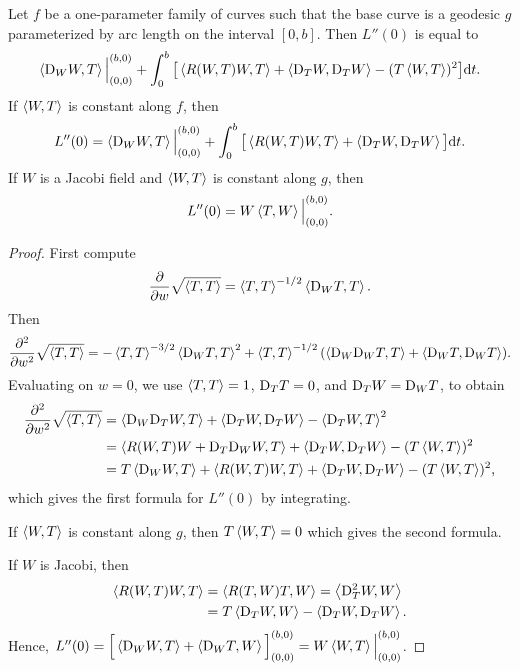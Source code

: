 \documentclass[../main]{subfiles}
\begin{document}
\begin{theorem} \label{thm:ch10.2.6}
    Let $f$ be a one-parameter family of curves such that the base curve is a geodesic $g$ parameterized by arc length on the interval $[0,b]$. Then $L''(0)$ is equal to
    \[ \left\langle\mathrm{D}_W W,T\right\rangle\Big|_{(0,0)}^{(b,0)} + \int_0^b \big[\left\langle R(W, T)W,T\right\rangle + \left\langle\mathrm{D}_T W,\mathrm{D}_T W\right\rangle - (T\left\langle W,T\right\rangle)^2\big] \mathrm{d}t\text{.} \]
    If $\left\langle W,T\right\rangle$ is constant along $f$, then
    \[ L''(0) = \left\langle\mathrm{D}_W W,T\right\rangle\Big|_{(0,0)}^{(b,0)} + \int_0^b \big[\left\langle R(W, T)W,T\right\rangle + \left\langle\mathrm{D}_T W,\mathrm{D}_T W\right\rangle\big] \mathrm{d}t\text{.} \]
    If $W$ is a Jacobi field and $\left\langle W,T\right\rangle$ is constant along $g$, then
    \[ L''(0) = W\left\langle T,W\right\rangle\Big|_{(0,0)}^{(b,0)}\text{.} \]
\end{theorem}

\begin{proof}
    First compute \[\dfrac{\partial }{\partial w}\sqrt{\left\langle T,T\right\rangle} = \left\langle T,T\right\rangle^{-1/2}\left\langle\mathrm{D}_W T,T\right\rangle.\] Then
    \[
        \frac{\partial^2}{\partial w^2}\sqrt{\left\langle T,T\right\rangle} = -\left\langle T,T\right\rangle^{-3/2}\left\langle\mathrm{D}_W T,T\right\rangle^2 
        + \left\langle T,T\right\rangle^{-1/2}(\left\langle\mathrm{D}_W \mathrm{D}_W T,T\right\rangle  + \left\langle\mathrm{D}_W T,\mathrm{D}_W T\right\rangle).
    \]%
    Evaluating on $w = 0$, we use $\left\langle T,T\right\rangle = 1$, $\mathrm{D}_T T = 0$, and $\mathrm{D}_T W = \mathrm{D}_W T$, to obtain 
    \begin{align*}
        \frac{\partial^2}{\partial w^2} \sqrt{\left\langle T,T\right\rangle} &= \left\langle\mathrm{D}_W \mathrm{D}_T W,T\right\rangle + \left\langle\mathrm{D}_T W,\mathrm{D}_T W\right\rangle - \left\langle\mathrm{D}_T W,T\right\rangle^2 \\
        &= \left\langle R(W, T)W+\mathrm{D}_T\mathrm{D}_WW,T\right\rangle + \left\langle\mathrm{D}_T W,\mathrm{D}_T W\right\rangle - (T\left\langle W,T\right\rangle)^2 \\
        &= T\left\langle\mathrm{D}_W W,T\right\rangle + \left\langle R(W, T)W,T\right\rangle + \left\langle\mathrm{D}_T W,\mathrm{D}_T W\right\rangle - (T\left\langle W,T\right\rangle)^2\text{,}
    \end{align*}%
    which gives the first formula for $L''(0)$ by integrating.

    If $\left\langle W,T\right\rangle$ is constant along $g$, then $T\left\langle W,T\right\rangle = 0$ which gives the second formula.

    If $W$ is Jacobi, then
    \begin{align*}
        \left\langle R(W, T)W,T\right\rangle &= \left\langle R(T, W)T,W\right\rangle = \left\langle\mathrm{D}_T^2 W,W\right\rangle \\
        &= T\left\langle\mathrm{D}_T W,W\right\rangle - \left\langle\mathrm{D}_T W,\mathrm{D}_T W\right\rangle\text{.}
    \end{align*}%
    Hence, $L''(0) = \Big[\left\langle\mathrm{D}_W W,T\right\rangle + \left\langle\mathrm{D}_W T ,W\right\rangle\Big]_{(0,0)}^{(b,0)} = W\left\langle W,T\right\rangle\Big|_{(0,0)}^{(b,0)}$.
\end{proof}
\end{document}
